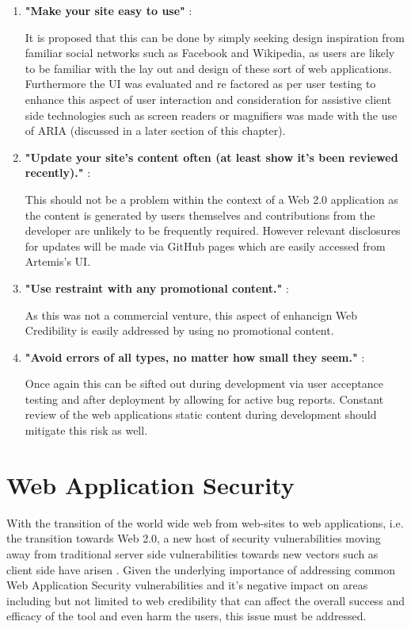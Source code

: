 \begin{enumerate}
    \item \textbf{"Make your site easy to use"} \cite{Fogg2002a}:
    
    It is proposed that this can be done by simply seeking design inspiration from familiar social networks such as Facebook and Wikipedia, as users are likely to be familiar with the lay out and design of these sort of web applications\cite{Fogg2002a}. Furthermore the UI was evaluated and re factored as per user testing to enhance this aspect of user interaction and consideration  for assistive client side technologies such as screen readers or magnifiers was made with the use of ARIA (discussed in a later section of this chapter).
    
    \item \textbf{"Update your site's content often (at least show it's been reviewed recently)."} \cite{Fogg2002a}:
    
    This should not be a problem within the context of a Web 2.0 application as the content is generated by users themselves and contributions from the developer are unlikely to be frequently required. However relevant disclosures for updates will be made via GitHub pages which are easily accessed from Artemis's UI.
    
    \item \textbf{"Use restraint with any promotional content."} \cite{Fogg2002a}:
    
    As this was not a commercial venture, this aspect of enhancign Web Credibility is easily addressed by using no promotional content.
    
    \item \textbf{"Avoid errors of all types, no matter how small they seem."} \cite{Fogg2002a}:
    
    Once again this can be sifted out during development via user acceptance testing and after deployment by allowing for active bug reports. Constant review of the web applications static content during development should mitigate this risk as well.
\end{enumerate}
\newpage


\section{Web Application Security}

With the transition of the world wide web from web-sites to web applications, i.e. the transition towards Web 2.0, a new host of security vulnerabilities moving away from traditional server side vulnerabilities towards new vectors such as client side have arisen \cite{Dayfdd2011}. Given the underlying importance of addressing common Web Application Security vulnerabilities \cite{Dayfdd2011} and it's negative impact on areas including but not limited to web credibility \cite{Fogg2002a,Fogg1999} that can affect the overall success and efficacy of the tool and even harm the users, this issue must be addressed.

